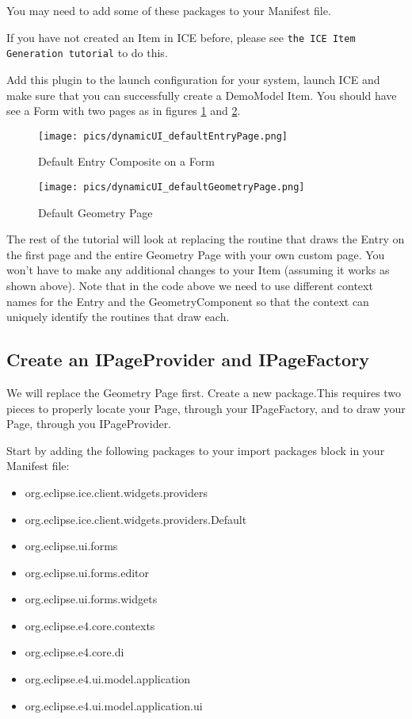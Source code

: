 You may need to add some of these packages to your Manifest file.

If you have not created an Item in ICE before, please see \texttt{the ICE Item
Generation tutorial} to do this.

Add this plugin to the launch configuration for your system, launch ICE and
make sure that you can successfully create a DemoModel Item. You should have
see a Form with two pages as in figures \ref{fig:iceDefaultEntryPage} and
\ref{fig:iceDefaultGeometryPage}.

\begin{figure}[h]
\texttt{[image: pics/dynamicUI\_defaultEntryPage.png]}
\caption{Default Entry Composite on a Form}
\label{fig:iceDefaultEntryPage}
\end{figure}

\begin{figure}[h]
\texttt{[image: pics/dynamicUI\_defaultGeometryPage.png]}
\caption{Default Geometry Page}
\label{fig:iceDefaultGeometryPage}
\end{figure}

The rest of the tutorial will look at replacing the routine that draws the
Entry on the first page and the entire Geometry Page with your own custom page.
You won’t have to make any additional changes to your Item (assuming it works
as shown above). Note that in the code above we need to use different context
names for the Entry and the GeometryComponent so that the context can uniquely
identify the routines that draw each.

\subsection{Create an IPageProvider and IPageFactory}

We will replace the Geometry Page first. Create a new package.This requires two
pieces to properly locate your Page, through your IPageFactory, and to draw
your Page, through you IPageProvider.

Start by adding the following packages to your import packages block in your
Manifest file:
\begin{itemize}
  \item org.eclipse.ice.client.widgets.providers
  \item org.eclipse.ice.client.widgets.providers.Default
  \item org.eclipse.ui.forms
  \item org.eclipse.ui.forms.editor
  \item org.eclipse.ui.forms.widgets
  \item org.eclipse.e4.core.contexts
  \item org.eclipse.e4.core.di
  \item org.eclipse.e4.ui.model.application
  \item org.eclipse.e4.ui.model.application.ui
\end{itemize}


